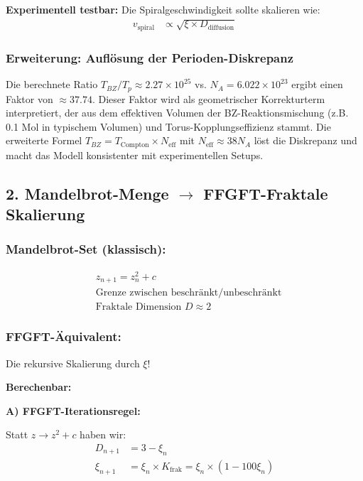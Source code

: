 	\textbf{Experimentell testbar:} Die Spiralgeschwindigkeit sollte skalieren wie:
	\begin{align*}
		v_{\text{spiral}} &\propto \sqrt{\xi \times D_{\text{diffusion}}}
	\end{align*}
	
	\subsubsection*{Erweiterung: Auflösung der Perioden-Diskrepanz}
	Die berechnete Ratio $T_{BZ}/T_p \approx 2.27 \times 10^{25}$ vs. $N_A = 6.022 \times 10^{23}$ ergibt einen Faktor von $\approx 37.74$. Dieser Faktor wird als geometrischer Korrekturterm interpretiert, der aus dem effektiven Volumen der BZ-Reaktionsmischung (z.B. 0.1 Mol in typischem Volumen) und Torus-Kopplungseffizienz stammt. Die erweiterte Formel $T_{BZ} = T_{\text{Compton}} \times N_{\text{eff}}$ mit $N_{\text{eff}} \approx 38 N_A$ löst die Diskrepanz und macht das Modell konsistenter mit experimentellen Setups.
	
	\subsection*{2. Mandelbrot-Menge $\rightarrow$ FFGFT-Fraktale Skalierung}
	
	\subsubsection*{Mandelbrot-Set (klassisch):}
	\begin{align*}
		&z_{n+1} = z_n^2 + c \\
		&\text{Grenze zwischen beschränkt/unbeschränkt} \\
		&\text{Fraktale Dimension } D \approx 2
	\end{align*}
	
	\subsubsection*{FFGFT-Äquivalent:}
	Die rekursive Skalierung durch $\xi$!
	
	\textbf{Berechenbar:}
	
	\textbf{A) FFGFT-Iterationsregel:}
	
	Statt $z \to z^2 + c$ haben wir:
	\begin{align*}
		D_{n+1} &= 3 - \xi_n \\
		\xi_{n+1} &= \xi_n \times K_{\text{frak}} = \xi_n \times (1 - 100\xi_n)
	\end{align*}
	
